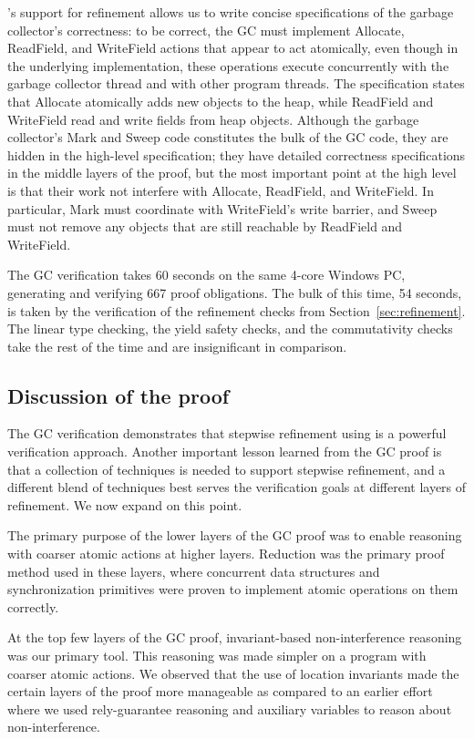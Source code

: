 \civl's support for refinement allows us to write concise specifications of the garbage collector's correctness:
to be correct, the GC must implement Allocate, ReadField, and WriteField actions that appear to act atomically,
even though in the underlying implementation,
these operations execute concurrently with the garbage collector thread and with other program threads.
The specification states that Allocate atomically adds new objects to the heap,
while ReadField and WriteField read and write fields from heap objects.
Although the garbage collector's Mark and Sweep code constitutes the bulk of the GC code,
they are hidden in the high-level specification;
they have detailed correctness specifications in the middle layers of the proof,
but the most important point at the high level is that their work not interfere with Allocate, ReadField, and WriteField.
In particular, Mark must coordinate with WriteField's write barrier,
and Sweep must not remove any objects that are still reachable by ReadField and WriteField.

The GC verification takes 60 seconds on the same 4-core Windows PC, generating and verifying 667 proof obligations. 
The bulk of this time, 54 seconds, is taken by the verification of the refinement checks from Section~\ref{sec:refinement}.
The linear type checking, the yield safety checks, and the commutativity checks take the rest of the time and are insignificant in comparison.

\subsection{Discussion of the proof}
The GC verification demonstrates that stepwise refinement using \civl is a
powerful verification approach. 
Another important lesson learned from the GC proof is that a collection
of techniques is needed to support stepwise refinement, and a different blend of
techniques best serves the verification goals at different layers of refinement. 
We now expand on this point. 

The primary purpose of the lower layers of the GC proof was to enable
reasoning with coarser atomic actions at higher layers. 
Reduction was the primary proof method used in these layers, where
concurrent data structures and synchronization primitives were proven
to implement atomic operations on them correctly. 

At the top few layers of the GC proof, invariant-based
non-interference reasoning was our primary tool. 
This reasoning was made simpler on a program with coarser
atomic actions. 
We observed that the use
of location invariants made the certain layers of the proof more
manageable as compared to an earlier effort where we used
rely-guarantee reasoning and auxiliary variables to reason about
non-interference.  

